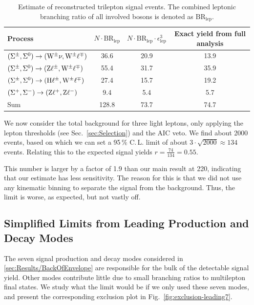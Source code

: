 \begin{table}
\centering
\caption{Estimate of reconstructed trilepton signal events. The combined leptonic branching ratio of all involved bosons is denoted as $\textrm{BR}_\textrm{lep}$.} \label{tab:BackOfEnvelope/2}
\begin{tabular}{lccc}
\hline\hline
Process & $N \cdot \textrm{BR}_\textrm{lep}$ & $N \cdot \textrm{BR}_\textrm{lep} \cdot \epsilon_\textrm{lep}^3$ & Exact yield from full analysis \\
\hline
$(\Sigma^\pm, \Sigma^0) \to (\mathrm{W}^\pm \nu, \mathrm{W}^\pm \ell^\mp)$  & 36.6 & 20.9 & 13.9 \\ %
$(\Sigma^\pm, \Sigma^0) \to (\mathrm{Z} \ell^\pm, \mathrm{W}^\pm \ell^\mp)$  & 55.4 & 31.7 & 35.9 \\ %
$(\Sigma^\pm, \Sigma^0) \to (\mathrm{H} \ell^\pm, \mathrm{W}^\pm \ell^\mp)$ & 27.4 & 15.7 & 19.2 \\ %
$(\Sigma^+, \Sigma^-) \to (\mathrm{Z} \ell^+, \mathrm{Z} \ell^-)$             & 9.4  & 5.4  & 5.7  \\ %
\hline
Sum               & 128.8                & 73.7              & 74.7 \\
\end{tabular}
\end{table}

We now consider the total background for three light leptons, only applying the lepton \pt thresholds (see Sec.~\ref{sec:Selection}) and the AIC veto. We find about 2000 events, based on which we can set a 95\,\% C.\,L. limit of about $3 \cdot \sqrt{2000} \approx 134$ events. Relating this to the expected signal yields $r = \frac{74}{134} = 0.55$.

This number is larger by a factor of 1.9 than our main result at 220\GeV, indicating that our estimate has less sensitivity. The reason for this is that we did not use any kinematic binning to separate the signal from the background. Thus, the limit is worse, as expected, but not vastly off.

\subsection{Simplified Limits from Leading Production and Decay Modes}
The seven signal production and decay modes considered in \ref{sec:Results/BackOfEnvelope} are responsible for the bulk of the detectable signal yield. Other modes contribute little due to small branching ratios to multilepton final states. We study what the limit would be if we only used these seven modes, and present the corresponding exclusion plot in Fig.~\ref{fig:exclusion-leading7}.

